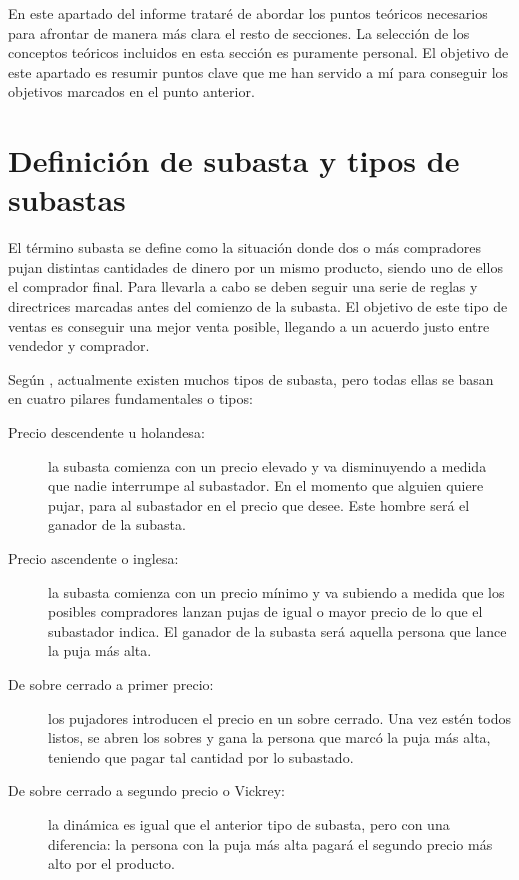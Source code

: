 	En este apartado del informe trataré de abordar los puntos teóricos necesarios para afrontar de manera más clara el resto de secciones. La selección de los conceptos teóricos incluidos en esta sección es puramente personal. El objetivo de este apartado es resumir puntos clave que me han servido a mí para conseguir los objetivos marcados en el punto anterior.
	
\section{Definición de subasta y tipos de subastas}

	El término subasta se define como la situación donde dos o más compradores pujan distintas cantidades de dinero por un mismo producto, siendo uno de ellos el comprador final. Para llevarla a cabo se deben seguir una serie de reglas y directrices marcadas antes del comienzo de la subasta. El objetivo de este tipo de ventas es conseguir una mejor venta posible, llegando a un acuerdo justo entre vendedor y comprador.
	
	Según \cite{apuntes:ecommerce_adwords}, actualmente existen muchos tipos de subasta, pero todas ellas se basan en cuatro pilares fundamentales o tipos:
	
	\begin{description}
		\item[Precio descendente u holandesa:] la subasta comienza con un precio elevado y va disminuyendo a medida que nadie interrumpe al subastador. En el momento que alguien quiere pujar, para al subastador en el precio que desee. Este hombre será el ganador de la subasta.
		\item[Precio ascendente o inglesa:] la subasta comienza con un precio mínimo y va subiendo a medida que los posibles compradores lanzan pujas de igual o mayor precio de lo que el subastador indica. El ganador de la subasta será aquella persona que lance la puja más alta.
		\item[De sobre cerrado a primer precio:] los pujadores introducen el precio en un sobre cerrado. Una vez estén todos listos, se abren los sobres y gana la persona que marcó la puja más alta, teniendo que pagar tal cantidad por lo subastado.
		\item[De sobre cerrado a segundo precio o Vickrey:] la dinámica es igual que el anterior tipo de subasta, pero con una diferencia: la persona con la puja más alta pagará el segundo precio más alto por el producto.
	\end{description}
	
